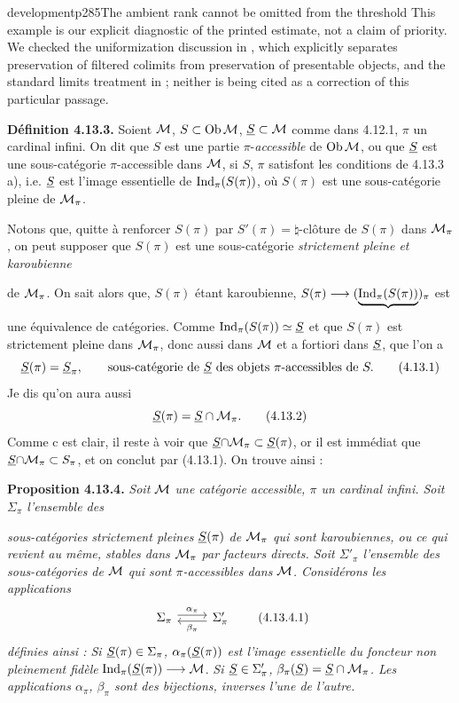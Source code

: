 \begin{dcomment}{development}{p285}{The ambient rank cannot be omitted from the threshold}
This example is our explicit diagnostic of the printed estimate, not a claim of priority. We checked the uniformization discussion in \citet[\S2.3]{Raptis2020}, which explicitly separates preservation of filtered colimits from preservation of presentable objects, and the standard limits treatment in \citet{Positselski2024Limits}; neither is being cited as a correction of this particular passage.
\end{dcomment}


\textbf{Définition 4.13.3.} Soient $\mathcal{M}$, $S \subset \operatorname{Ob}\mathcal{M}$, $\underline{S} \subset \mathcal{M}$ comme dans 4.12.1, $\pi$ un cardinal infini. On dit que $S$ est une partie $\pi$-\textit{accessible} de $\operatorname{Ob}\mathcal{M}$, ou que $\underline{S}$ est une sous-catégorie $\pi$-accessible dans $\mathcal{M}$, si $S$, $\pi$ satisfont les conditions de 4.13.3 a), i.e. $\underline{S}$ est l'image essentielle %
de $\mathrm{Ind}_\pi(S(\pi))$, où $S(\pi)$ est une sous-catégorie pleine de $\mathcal{M}_\pi$.

Notons que, quitte à renforcer $S(\pi)$ par $S'(\pi) = {\natural}$-clôture de $S(\pi)$ dans $\mathcal{M}_\pi$, on peut supposer que $S(\pi)$ est une sous-catégorie \textit{strictement pleine et karoubienne}

de $\mathcal{M}_\pi$. On sait alors que, $S(\pi)$ étant karoubienne, $S(\pi) \longrightarrow (\underbrace{\mathrm{Ind}_\pi(S(\pi))}_{})_\pi$ est une équivalence de catégories. Comme $\mathrm{Ind}_\pi(S(\pi)) \simeq \underline{S}$ et que $S(\pi)$ est strictement pleine dans $\mathcal{M}_\pi$, donc aussi dans $\mathcal{M}$ et a fortiori dans $\underline{S}$, que l'on a
\[
\uS(\pi) = \uS_\pi , \qquad \text{sous-catégorie de } \uS \text{ des objets } \pi\text{-accessibles de } S. \tag*{(4.13.1)}
\]
Je dis qu'on aura aussi
\[
\uS(\pi) = \uS \cap \M_\pi . \tag*{(4.13.2)}
\]
Comme c est clair, il reste à voir que $\underline{S}{\cap}\mathcal{M}_\pi \subset \underline{S}(\pi)$, or il est immédiat que $\underline{S}{\cap}\mathcal{M}_\pi \subset S_\pi$, %
et on conclut par (4.13.1). On trouve ainsi :

\textbf{Proposition 4.13.4.} \textit{Soit $\mathcal{M}$ une catégorie accessible, $\pi$ un cardinal infini. Soit $\Sigma_\pi$ l'ensemble des}

\textit{sous-catégories strictement pleines $\underline{S}(\pi)$ de $\mathcal{M}_\pi$ qui sont karoubiennes, ou ce qui revient au même, stables dans $\mathcal{M}_\pi$ par facteurs directs. Soit $\Sigma'_\pi$ l'ensemble des sous-catégories de}
\textit{$\mathcal{M}$ qui sont $\pi$-accessibles dans $\mathcal{M}$. Considérons les applications}
\[
\begin{tikzcd}
\Sigma_\pi \arrow[r, shift left, "\alpha_\pi"] & \Sigma'_\pi \arrow[l, shift left, "\beta_\pi"]
\end{tikzcd}
\tag*{(4.13.4.1)}
\]
\textit{définies ainsi : Si $\underline{S}(\pi) \in \Sigma_\pi$, $\alpha_\pi(\underline{S}(\pi))$ est l'image essentielle du foncteur non pleinement fidèle} $\mathrm{Ind}_\pi(\underline{S}(\pi)) \longrightarrow \mathcal{M}$. \textit{Si $\underline{S} \in \Sigma'_\pi$, $\beta_\pi(\underline{S}) = \underline{S} \cap \mathcal{M}_\pi$. Les applications $\alpha_\pi$, $\beta_\pi$ sont des bijections, inverses l'une de l'autre.}


